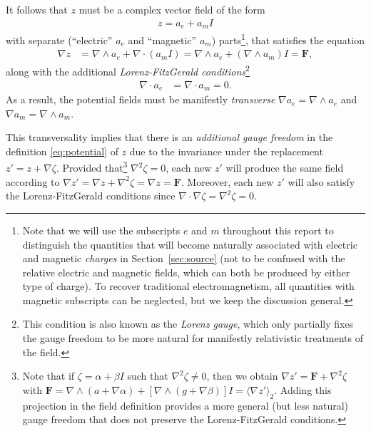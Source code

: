 \documentclass[1p,sort&compress]{elsarticle}
\numberwithin{equation}{section}
\newcommand{\bv}[1]{\mathbf{#1}}
\newcommand{\mean}[1]{\langle #1 \rangle}
\begin{document}
It follows that $z$ must be a complex vector field of the form
\begin{align}\label{eq:complexpotential}
  z = a_e + a_m I
\end{align}
with separate (``electric'' $a_e$ and ``magnetic'' $a_m$) parts\footnote{Note that we will use the subscripts $e$ and $m$ throughout this report to distinguish the quantities that will become naturally associated with electric and magnetic \emph{charges} in Section~\ref{sec:source} (not to be confused with the relative electric and magnetic fields, which can both be produced by either type of charge). To recover traditional electromagnetism, all quantities with magnetic subscripts can be neglected, but we keep the discussion general.}, that satisfies the equation
\begin{align}\label{eq:potentialexpanded}
  \nabla z &= \nabla\wedge a_e + \nabla \cdot(a_m I) = \nabla\wedge a_e + (\nabla\wedge a_m)I = \bv{F},
\end{align}
along with the additional \emph{Lorenz-FitzGerald conditions}\footnote{This condition is also known as the \emph{Lorenz gauge}, which only partially fixes the gauge freedom to be more natural for manifestly relativistic treatments of the field.}
\begin{align}
  \label{eq:lorenzconditions}
  \nabla \cdot a_e &= \nabla \cdot a_m = 0.
\end{align}
As a result, the potential fields must be manifestly \emph{transverse} $\nabla a_e = \nabla \wedge a_e$ and $\nabla a_m = \nabla \wedge a_m$.  

This transversality implies that there is an \emph{additional gauge freedom} in the definition \eqref{eq:potential} of $z$ due to the invariance under the replacement $z' = z + \nabla\zeta$.  Provided that\footnote{Note that if $\zeta = \alpha + \beta I$ such that $\nabla^2\zeta \neq 0$, then we obtain $\nabla z' = \bv{F} + \nabla^2\zeta$ with $\bv{F} = \nabla\wedge(a + \nabla\alpha) + [\nabla\wedge(g + \nabla\beta)] I = \mean{\nabla z'}_2$.  Adding this projection in the field definition provides a more general (but less natural) gauge freedom that does not preserve the Lorenz-FitzGerald conditions.} $\nabla^2\zeta = 0$, each new $z'$ will produce the same field according to $\nabla z' = \nabla z + \nabla^2 \zeta = \nabla z = \bv{F}$.  Moreover, each new $z'$ will also satisfy the Lorenz-FitzGerald conditions since $\nabla\cdot\nabla\zeta = \nabla^2\zeta = 0$.  

\end{document}
